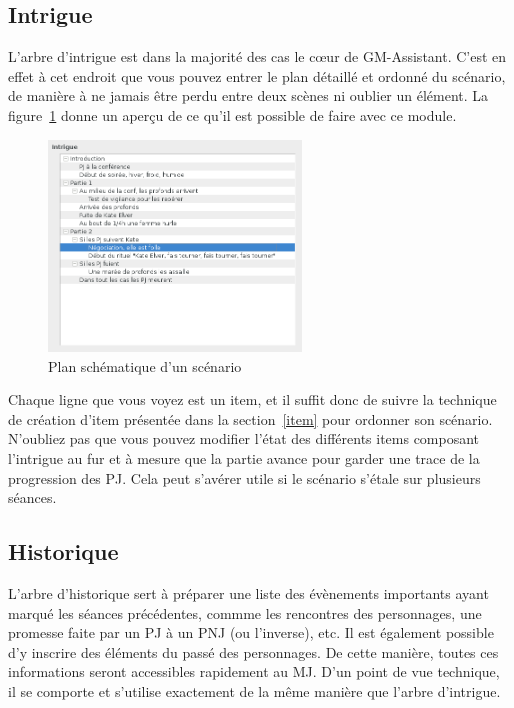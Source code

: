 \documentclass[a4paper,12pt]{article}
\newcommand*{\GMA}{GM-Assistant\xspace}
\begin{document}
\subsection{Intrigue}
\label{sec:intrigue}

L'arbre d'intrigue est dans la majorité des cas le cœur de \GMA.
C'est en effet à cet endroit que vous pouvez entrer le plan détaillé et ordonné du scénario, de manière à ne jamais être perdu entre deux scènes ni oublier un élément.
La figure~\ref{arbre_scenar} donne un aperçu de ce qu'il est possible de faire avec ce module.
\begin{figure}[h]
    \includegraphics[width=0.6\textwidth]{scenario_type}
    \caption{Plan schématique d'un scénario}
    \label{arbre_scenar}
\end{figure}
Chaque ligne que vous voyez est un item, et il suffit donc de suivre la technique de création d'item présentée dans la section~\ref{item} pour ordonner son scénario.
N'oubliez pas que vous pouvez modifier l'état des différents items composant l'intrigue au fur et à mesure que la partie avance pour garder une trace de la progression des PJ.
Cela peut s'avérer utile si le scénario s'étale sur plusieurs séances.

\subsection{Historique}
\label{sec:historique}

L'arbre d'historique sert à préparer une liste des évènements importants ayant marqué les séances précédentes, commme les rencontres des personnages, une promesse faite par un PJ à un PNJ (ou l'inverse), etc.
Il est également possible d'y inscrire des éléments du passé des personnages.
De cette manière, toutes ces informations seront accessibles rapidement au MJ.
D'un point de vue technique, il se comporte et s'utilise exactement de la même manière que l'arbre d'intrigue.
\end{document}
